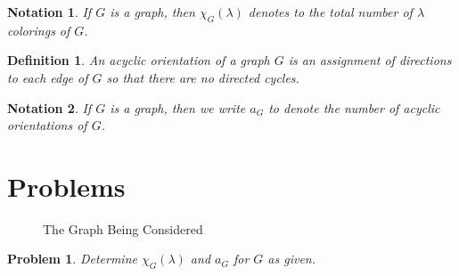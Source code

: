 \documentclass{article}
\theoremstyle{normal}
\newtheorem{problem}{Problem}
\newtheorem{definition}{Definition}
\newtheorem{notation}{Notation}
\theoremstyle{thmit}
\begin{document}
    \begin{notation}
        If $G$ is a graph, then $\chi_{G}(\lambda)$ denotes to the total number of
        $\lambda$ colorings of $G$.
    \end{notation}
    \begin{definition}
        An acyclic orientation of a graph $G$ is an assignment of directions to each
        edge of $G$ so that there are no directed cycles.
    \end{definition}
    \begin{notation}
        If $G$ is a graph, then we write $a_{G}$ to denote the number of acyclic
        orientations of $G$.
    \end{notation}
\section{Problems}
    \begin{figure}[H]
        \centering
        \caption{The Graph Being Considered}
        \label{fig:TheGraph}
    \end{figure}
    \begin{problem}
        Determine $\chi_G(\lambda)$ and $a_G$ for $G$ as given.
    \end{problem}
\end{document}
